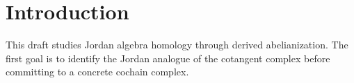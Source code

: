\section{Introduction}

This draft studies Jordan algebra homology through derived abelianization. The
first goal is to identify the Jordan analogue of the cotangent complex before
committing to a concrete cochain complex.
